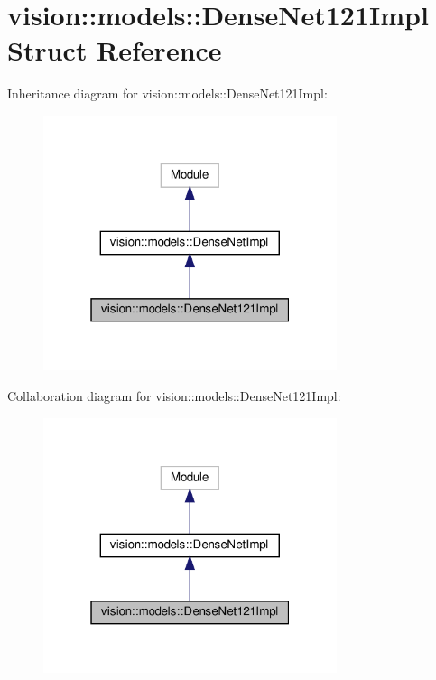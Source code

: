 \hypertarget{structvision_1_1models_1_1DenseNet121Impl}{}\section{vision\+:\+:models\+:\+:Dense\+Net121\+Impl Struct Reference}
\label{structvision_1_1models_1_1DenseNet121Impl}


Inheritance diagram for vision\+:\+:models\+:\+:Dense\+Net121\+Impl\+:
\nopagebreak
\begin{figure}[H]
\begin{center}
\leavevmode
\includegraphics[width=244pt]{structvision_1_1models_1_1DenseNet121Impl__inherit__graph}
\end{center}
\end{figure}


Collaboration diagram for vision\+:\+:models\+:\+:Dense\+Net121\+Impl\+:
\nopagebreak
\begin{figure}[H]
\begin{center}
\leavevmode
\includegraphics[width=244pt]{structvision_1_1models_1_1DenseNet121Impl__coll__graph}
\end{center}
\end{figure}
